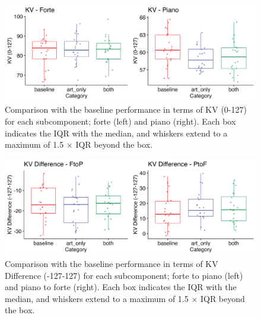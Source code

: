 \documentclass[
  man,floatsintext]{apa6}
\begin{document}
\begin{figure}
\includegraphics[width=1\linewidth]{manuscript_files/figure-latex/plot-vel-2-1} \caption{\label{fig:vel-2}Comparison with the baseline performance in terms of KV (0-127) for each subcomponent; forte (left) and piano (right). Each box indicates the IQR with the median, and whiskers extend to a maximum of 1.5 × IQR beyond the box.}\label{fig:plot-vel-2}
\end{figure}

\begin{figure}
\includegraphics[width=1\linewidth]{manuscript_files/figure-latex/plot-vel-diff-2-1} \caption{\label{fig:vel-diff-2}Comparison with the baseline performance in terms of KV Difference (-127-127) for each subcomponent; forte to piano (left) and piano to forte (right). Each box indicates the IQR with the median, and whiskers extend to a maximum of 1.5 × IQR beyond the box.}\label{fig:plot-vel-diff-2}
\end{figure}
\end{document}
